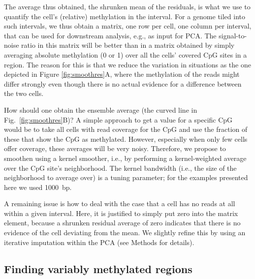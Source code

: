\documentclass[twocolumn,10pt]{article}
\begin{document}
The average thus obtained, the shrunken mean of the residuals, is what we use to quantify the cell's (relative) methylation in the interval.
For a genome tiled into such intervals, we thus obtain a matrix, one row per cell, one column per interval, that can be used for downstream analysis, e.g., as input for PCA.
The signal-to-noise ratio in this matrix will be better than in a matrix obtained by simply averaging absolute methylation (0 or 1) over all the cells' covered CpG sites in a region.
The reason for this is that we reduce the variation in situations as the one depicted in Figure \ref{fig:smoothres}A, where the methylation of the reads might differ strongly even though there is no actual evidence for a difference between the two cells.

How should one obtain the ensemble average (the curved line in Fig.~\ref{fig:smoothres}B)?
A simple approach to get a value for a specific CpG would be to take all cells with read coverage for the CpG and use the fraction of these that show the CpG as methylated.
However, especially when only few cells offer coverage, these averages will be very noisy.
Therefore, we propose to smoothen using a kernel smoother, i.e., by performing a kernel-weighted average over the CpG site's neighborhood.
The kernel bandwidth (i.e., the size of the neighborhood to average over) is a tuning parameter; for the examples presented here we used 1000~bp.

A remaining issue is how to deal with the case that a cell has no reads at all within a given interval. Here, it is justified to simply put zero into the matrix element, because a shrunken residual average of zero indicates that there is no evidence of the cell deviating from the mean. We slightly refine this by using an iterative imputation within the PCA (see Methods for details).


\subsection{Finding variably methylated regions}
\end{document}
